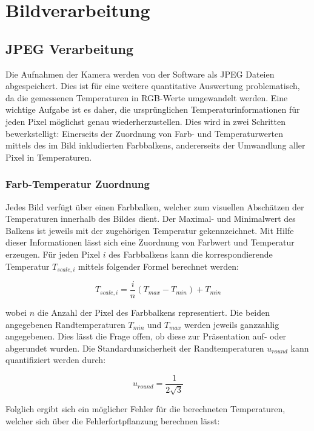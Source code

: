 \documentclass[10pt,a4paper,german]{article}
\begin{document}
\section{Bildverarbeitung}
\subsection{JPEG Verarbeitung}
Die Aufnahmen der Kamera werden von der Software als JPEG Dateien abgespeichert.
Dies ist für eine weitere quantitative Auswertung problematisch, da die gemessenen Temperaturen in RGB-Werte umgewandelt werden.
Eine wichtige Aufgabe ist es daher, die ursprünglichen Temperaturinformationen für jeden Pixel möglichst genau wiederherzustellen.
Dies wird in zwei Schritten bewerkstelligt:
Einerseits der Zuordnung von Farb- und Temperaturwerten mittels des im Bild inkludierten Farbbalkens, andererseits der Umwandlung aller Pixel in Temperaturen.

\subsubsection{Farb-Temperatur Zuordnung}
Jedes Bild verfügt über einen Farbbalken, welcher zum visuellen Abschätzen der Temperaturen innerhalb des Bildes dient.
Der Maximal- und Minimalwert des Balkens ist jeweils mit der zugehörigen Temperatur gekennzeichnet.
Mit Hilfe dieser Informationen lässt sich eine Zuordnung von Farbwert und Temperatur erzeugen.
Für jeden Pixel $i$ des Farbbalkens kann die korrespondierende Temperatur $T_{scale,i}$ mittels folgender Formel berechnet werden:

\begin{equation}
    T_{scale,i} = \frac{i}{n} \left(T_{max} - T_{min}\right) + T_{min}
\end{equation}

wobei $n$ die Anzahl der Pixel des Farbbalkens representiert.
Die beiden angegebenen Randtemperaturen $T_{min}$ und $T_{max}$ werden jeweils ganzzahlig angegebenen.
Dies lässt die Frage offen, ob diese zur Präsentation auf- oder abgerundet wurden.
Die Standardunsicherheit der Randtemperaturen $u_{round}$ kann quantifiziert werden durch:

\begin{equation}
    u_{round} = \frac{1}{2\sqrt{3}}
\end{equation}

Folglich ergibt sich ein möglicher Fehler für die berechneten Temperaturen, welcher sich über die Fehlerfortpflanzung berechnen lässt:
\end{document}
